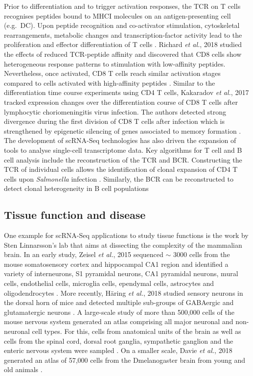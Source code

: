 Prior to differentiation and to trigger activation responses, the \gls{TCR} on T cells recognises peptides bound to \gls{MHCI} molecules on an antigen-presenting cell (e.g.~DC). Upon peptide recognition and co-activator stimulation, cytoskeletal rearrangements, metabolic changes and transcription-factor activity lead to the proliferation and effector differentiation of T cells \citep{Richard2018}. Richard \emph{et al.}, 2018 studied the effects of reduced TCR-peptide affinity and discovered that CD8\plus{} cells show heterogeneous response patterns to stimulation with low-affinity peptides. Nevertheless, once activated, CD8\plus{} T cells reach similar activation stages compared to cells activated with high-affinity peptides \citep{Richard2018}. Similar to the differentiation time course experiments using CD4\plus{} T cells, Kakaradov \emph{et al.}, 2017 tracked expression changes over the differentiation course of CD8\plus{} T cells after lymphocytic choriomeningitis virus infection. The authors detected strong divergence during the first division of CD8\plus{} T cells after infection which is strengthened by epigenetic silencing of genes associated to memory formation \citep{Kakaradov2017}.\\

The development of scRNA-Seq technologies has also driven the expansion of tools to analyse single-cell transcriptome data. Key algorithms for T cell and B cell analysis include the reconstruction of the TCR and \gls{BCR}. Constructing the TCR of individual cells allows the identification of clonal expansion of CD4\plus{} T cells upon \textit{Salmonella} infection \citep{Stubbington2016}. Similarly, the BCR can be reconstructed to detect clonal heterogeneity in B cell populations \citep{Canzar2017, Wu2018}

\subsection{Tissue function and disease}

One example for scRNA-Seq applications to study tissue functions is the work by Sten Linnarsson's lab that aims at dissecting the complexity of the mammalian brain. In an early study, Zeisel \emph{et al.}, 2015 sequenced $\sim$ 3000 cells from the mouse somatosensory cortex and hippocampal \gls{CA}1 region and identified a variety of interneurons, S1 pyramidal neurons, CA1 pyramidal neurons, mural cells, endothelial cells, microglia cells, ependymal cells, astrocytes and oligodendrocytes \citep{Zeisel2015}. More recently, H\"a{}ring \emph{et al.}, 2018 studied sensory neurons in the dorsal horn of mice and detected multiple sub-groups of \gls{GABA}ergic and glutamatergic neurons \citep{Haring2018}. A large-scale study of more than 500,000 cells of the mouse nervous system generated an atlas comprising all major neuronal and non-neuronal cell types. For this, cells from anatomical units of the brain as well as cells from the spinal cord, dorsal root ganglia, sympathetic ganglion and the enteric nervous system were sampled \citep{Zeisel2018}. On a smaller scale, Davie \emph{et al.}, 2018 generated an atlas of 57,000 cells from the \gls{Dmelanogaster} brain from young and old animals \cite{Davie2018}.\\


